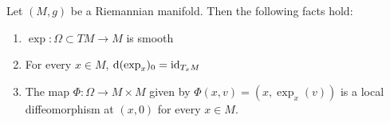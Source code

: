 

\begin{theorem}
Let $(M,g)$ be a Riemannian manifold. Then the following facts hold:
\begin{enumerate}
\item $\exp\colon\Omega\subset TM\to M$ is smooth
\item For every $x\in M$, $\mathrm{d}(\exp_{x})_{0}=\operatorname{id}_{T_{x}M}$
\item The map $\Phi\colon\Omega\to M\times M$ given by
  $\Phi(x,v)=(x,\exp_{x}(v))$ is a local diffeomorphism at $(x,0)$ for
  every $x\in M$.
\end{enumerate}
\end{theorem}

